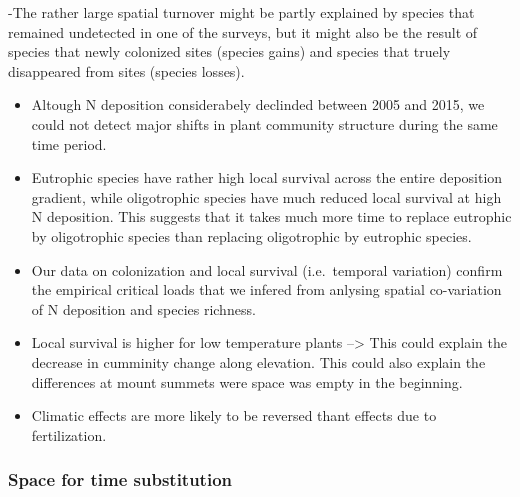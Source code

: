 \documentclass[fleqn,10pt,lineno]{wlpeerj} %
\theoremstyle{definition}
\theoremstyle{definition}
\theoremstyle{definition}
\theoremstyle{remark}
\begin{document}
-The rather large spatial turnover might be partly explained by species
that remained undetected in one of the surveys, but it might also be the
result of species that newly colonized sites (species gains) and species
that truely disappeared from sites (species losses).

\begin{itemize}
\item
  Altough N deposition considerabely declinded between 2005 and 2015, we
  could not detect major shifts in plant community structure during the
  same time period.
\item
  Eutrophic species have rather high local survival across the entire
  deposition gradient, while oligotrophic species have much reduced
  local survival at high N deposition. This suggests that it takes much
  more time to replace eutrophic by oligotrophic species than replacing
  oligotrophic by eutrophic species.
\item
  Our data on colonization and local survival (i.e.~temporal variation)
  confirm the empirical critical loads that we infered from anlysing
  spatial co-variation of N deposition and species richness.
\item
  Local survival is higher for low temperature plants --\textgreater{}
  This could explain the decrease in cumminity change along elevation.
  This could also explain the differences at mount summets were space
  was empty in the beginning.
\item
  Climatic effects are more likely to be reversed thant effects due to
  fertilization.
\end{itemize}

\subsubsection{Space for time
substitution}\label{space-for-time-substitution}
\end{document}
